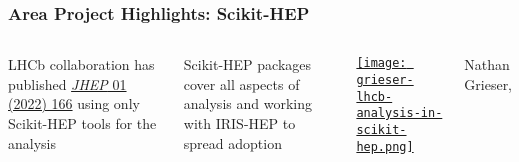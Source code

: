 \begin{frame}
  \frametitle{Area Project Highlights: Scikit-HEP}
\vspace{0.25 cm}
\begin{columns}

LHCb collaboration has published \href{https://inspirehep.net/literature/1889335}{\textit{JHEP} 01 (2022) 166} using only Scikit-HEP tools for the analysis

\vspace{0.75 cm}
Scikit-HEP packages cover all aspects of analysis and working with IRIS-HEP to spread adoption

\href{https://indico.cern.ch/event/1126109/contributions/4780169/}{\texttt{[image: grieser-lhcb-analysis-in-scikit-hep.png]}}
\vspace{-5pt}
\begin{center}
  Nathan Grieser, 
\end{center}
\end{columns}
\end{frame}

